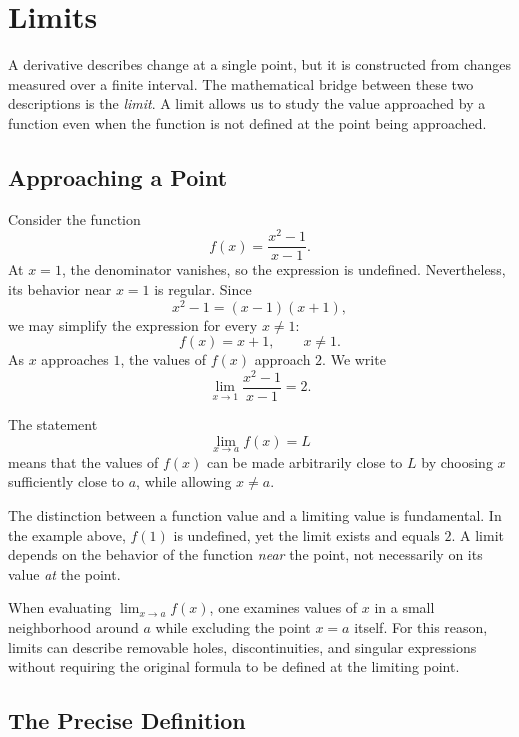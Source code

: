 \section{Limits}
\label{sec:limits}

A derivative describes change at a single point, but it is constructed from changes measured over a finite interval. The mathematical bridge between these two descriptions is the \emph{limit}. A limit allows us to study the value approached by a function even when the function is not defined at the point being approached.

\subsection{Approaching a Point}

Consider the function
\[
f(x)=\frac{x^2-1}{x-1}.
\]
At \(x=1\), the denominator vanishes, so the expression is undefined. Nevertheless, its behavior near \(x=1\) is regular. Since
\[
x^2-1=(x-1)(x+1),
\]
we may simplify the expression for every \(x\neq1\):
\[
f(x)=x+1,
\qquad x\neq1.
\]
As \(x\) approaches \(1\), the values of \(f(x)\) approach \(2\). We write
\[
\boxed{
\lim_{x\to1}\frac{x^2-1}{x-1}=2.
}
\]

\begin{bookdefinition}
The statement
\[
\lim_{x\to a}f(x)=L
\]
means that the values of \(f(x)\) can be made arbitrarily close to \(L\) by choosing \(x\) sufficiently close to \(a\), while allowing \(x\neq a\).
\end{bookdefinition}

The distinction between a function value and a limiting value is fundamental. In the example above, \(f(1)\) is undefined, yet the limit exists and equals \(2\). A limit depends on the behavior of the function \emph{near} the point, not necessarily on its value \emph{at} the point.

\begin{bookinsight}
When evaluating \(\lim_{x\to a}f(x)\), one examines values of \(x\) in a small neighborhood around \(a\) while excluding the point \(x=a\) itself. For this reason, limits can describe removable holes, discontinuities, and singular expressions without requiring the original formula to be defined at the limiting point.
\end{bookinsight}

\subsection{The Precise Definition}

